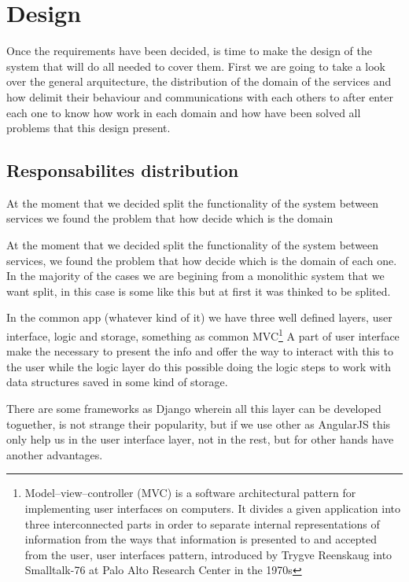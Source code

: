 \chapter{Design}

Once the requirements have been decided, is time to make the design of the system
 that will do all needed to cover them. First we are going to take a look over
 the general arquitecture, the distribution of the domain of the services and
 how delimit their behaviour and communications with each others to after enter
 each one to know how work in each domain and how have been solved all problems
 that this design present.

\section{Responsabilites distribution}

At the moment that we decided split the functionality of the system between
services we found the problem that how decide which is the domain

At the moment that we decided split the functionality of the system between
services, we found the problem that how decide which is the domain of each one.
In the majority of the cases we are begining from a monolithic system that we
want split, in this case is some like this but at first it was thinked to be splited.

In the common app (whatever kind of it) we have three well defined layers, user
interface, logic and storage, something as common MVC\footnote{Model–view–controller
(MVC) is a software architectural pattern for implementing user interfaces on
computers. It divides a given application into three interconnected parts in
order to separate internal representations of information from the ways that
information is presented to and accepted from the user, user interfaces pattern,
introduced by Trygve Reenskaug into Smalltalk-76 at Palo Alto Research Center in the 1970s}
A part of user interface make the necessary to present the info and offer the
way to interact with this to the user while the logic layer do this possible
doing the logic steps to work with data structures saved in some kind of storage.

There are some frameworks as Django wherein all this layer can be developed
toguether, is not strange their popularity, but if we use other as AngularJS
this only help us in the user interface layer, not in the rest, but for other
hands have another advantages.

